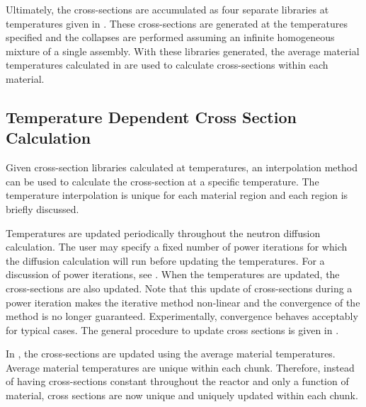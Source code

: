     Ultimately, the cross-sections are accumulated as four separate libraries at
    temperatures given in . These cross-sections are generated
    at the temperatures specified and the collapses are performed assuming an
    infinite homogeneous mixture of a single assembly. With these libraries
    generated, the average material temperatures calculated in 
     are used to calculate cross-sections within each
    material.

  \subsection{Temperature Dependent Cross Section Calculation}
    Given cross-section libraries calculated at temperatures, an interpolation
    method can be used to calculate the cross-section at a specific temperature.
    The temperature interpolation is unique for each material region and each
    region is briefly discussed.

    Temperatures are updated periodically throughout the neutron diffusion
    calculation. The user may specify a fixed number of power iterations for
    which the diffusion calculation will run before updating the temperatures.
    For a discussion of power iterations, see . When
    the temperatures are updated, the cross-sections are also updated. Note that
    this update of cross-sections during a power iteration makes the iterative
    method non-linear and the convergence of the method is no longer guaranteed.
    Experimentally, convergence behaves acceptably for typical cases. The
    general procedure to update cross sections is given in
    .

    In , the cross-sections are
    updated using the average material temperatures. Average material
    temperatures are unique within each chunk. Therefore, instead of having
    cross-sections constant throughout the reactor and only a function of
    material, cross sections are now unique and uniquely updated within each
    chunk.

